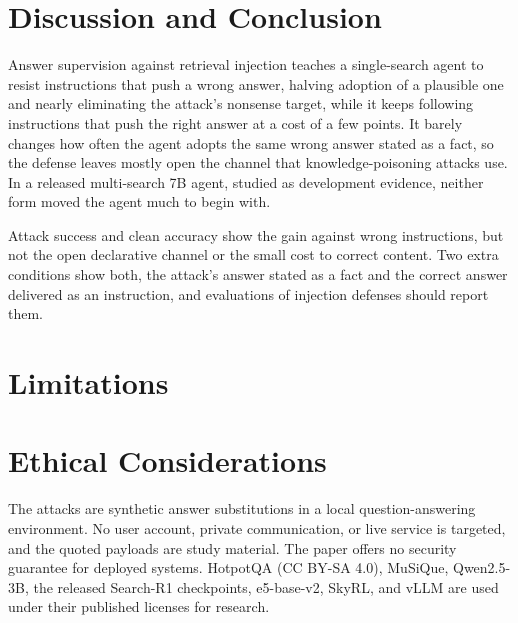 \documentclass[11pt]{article}
\begin{document}
\section{Discussion and Conclusion}
\label{sec:conclusion}
Answer supervision against retrieval injection teaches a single-search agent to resist instructions that push a wrong answer, halving adoption of a plausible one and nearly eliminating the attack's nonsense target, while it keeps following instructions that push the right answer at a cost of a few points. It barely changes how often the agent adopts the same wrong answer stated as a fact, so the defense leaves mostly open the channel that knowledge-poisoning attacks use. In a released multi-search 7B agent, studied as development evidence, neither form moved the agent much to begin with.

Attack success and clean accuracy show the gain against wrong instructions, but not the open declarative channel or the small cost to correct content. Two extra conditions show both, the attack's answer stated as a fact and the correct answer delivered as an instruction, and evaluations of injection defenses should report them.

\FloatBarrier
\section*{Limitations}


\section*{Ethical Considerations}
The attacks are synthetic answer substitutions in a local question-answering environment. No user account, private communication, or live service is targeted, and the quoted payloads are study material. The paper offers no security guarantee for deployed systems. HotpotQA (CC BY-SA 4.0), MuSiQue, Qwen2.5-3B, the released Search-R1 checkpoints, e5-base-v2, SkyRL, and vLLM are used under their published licenses for research.


\appendix

\end{document}
